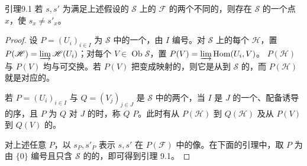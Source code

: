 \begin{SGAresult}{引理}{9.1}
若 $s,s'$ 为满足上述假设的 $\mathscr S$ 上的 $\mathscr F$ 的两个不同的，则存在 $\mathscr S$ 的一个点 $x$，使 $s_x\ne s'_x$。
\end{SGAresult}
\begin{proof}
设 $P=(U_i)_{i\in I}$ 为 $\mathscr S$ 中的一个，由 $I$ 编号。对 $\mathscr S$ 上的每个 $\mathscr H$，置 $P(\mathscr H)=\varinjlim\mathscr H(U_i)$；对每个 $V\in\operatorname{Ob}\mathscr S$，置 $P(V)=\varinjlim\operatorname{Hom}(U_i,V)$。 $P(\mathscr H)$ 与 $P(V)$ 均与可交换。若 $P(V)$ 把变成映射的，则它是从到 $\mathscr S$ 的，而 $P(\mathscr H)$ 就是对应的。

若 $P=(U_i)_{i\in I}$ 与 $Q=(V_j)_{j\in J}$ 是 $\mathscr S$ 中的两个，当 $I$ 是 $J$ 的一个、配备诱导的序，且 $P$ 为 $Q$ 对 $J$ 的时，称 $Q$  $P$。此时有从 $P(\mathscr H)$ 到 $Q(\mathscr H)$ 及从 $P(V)$ 到 $Q(V)$ 的。

对上述任意 $P$，以 $s_P,s'_P$ 表示 $s,s'$ 在 $P(\mathscr F)$ 中的像。在下面的引理中，取 $P$ 为由 $\{0\}$ 编号且只含 $\mathscr S$ 的的，即可得到引理 9.1。
\end{proof}

